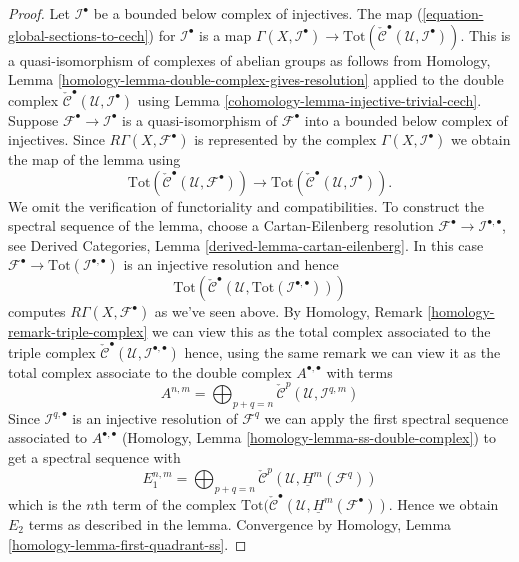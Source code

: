 \begin{proof}

Let ${\mathcal I}^\bullet$ be a bounded below complex of injectives.
The map (\ref{equation-global-sections-to-cech}) for
$\mathcal{I}^\bullet$ is a map
$\Gamma(X, {\mathcal I}^\bullet) \to
\text{Tot}(\check{\mathcal{C}}^\bullet({\mathcal U}, {\mathcal I}^\bullet))$.
This is a quasi-isomorphism of complexes of abelian groups
as follows from
Homology, Lemma \ref{homology-lemma-double-complex-gives-resolution}
applied to the double complex
$\check{\mathcal{C}}^\bullet({\mathcal U}, {\mathcal I}^\bullet)$ using
Lemma \ref{cohomology-lemma-injective-trivial-cech}.
Suppose ${\mathcal F}^\bullet \to {\mathcal I}^\bullet$ is a quasi-isomorphism
of ${\mathcal F}^\bullet$ into a bounded below complex of injectives.
Since $R\Gamma(X, {\mathcal F}^\bullet)$ is represented by the complex
$\Gamma(X, {\mathcal I}^\bullet)$ we obtain the map of the lemma
using
$$
\text{Tot}(\check{\mathcal{C}}^\bullet({\mathcal U}, {\mathcal F}^\bullet))
\longrightarrow
\text{Tot}(\check{\mathcal{C}}^\bullet({\mathcal U}, {\mathcal I}^\bullet)).
$$
We omit the verification of functoriality and compatibilities.
To construct the spectral sequence of the lemma, choose a Cartan-Eilenberg
resolution $\mathcal{F}^\bullet \to \mathcal{I}^{\bullet, \bullet}$, see
Derived Categories, Lemma \ref{derived-lemma-cartan-eilenberg}. In this
case $\mathcal{F}^\bullet \to \text{Tot}(\mathcal{I}^{\bullet, \bullet})$
is an injective resolution and hence
$$
\text{Tot}(\check{\mathcal{C}}^\bullet({\mathcal U},
\text{Tot}({\mathcal I}^{\bullet, \bullet})))
$$
computes $R\Gamma(X, \mathcal{F}^\bullet)$ as we've seen above.
By Homology, Remark \ref{homology-remark-triple-complex}
we can view this as the total complex associated to the
triple complex
$\check{\mathcal{C}}^\bullet({\mathcal U}, {\mathcal I}^{\bullet, \bullet})$
hence, using the same remark we can view it as the total complex
associate to the double complex $A^{\bullet, \bullet}$ with terms
$$
A^{n, m} =
\bigoplus\nolimits_{p + q = n}
\check{\mathcal{C}}^p({\mathcal U}, \mathcal{I}^{q, m})
$$
Since $\mathcal{I}^{q, \bullet}$ is an injective resolution of
$\mathcal{F}^q$ we can apply the first spectral sequence associated to
$A^{\bullet, \bullet}$
(Homology, Lemma \ref{homology-lemma-ss-double-complex})
to get a spectral sequence with
$$
E_1^{n, m} =
\bigoplus\nolimits_{p + q = n}
\check{\mathcal{C}}^p(\mathcal{U}, \underline{H}^m(\mathcal{F}^q))
$$
which is the $n$th term of the complex
$\text{Tot}(\check{\mathcal{C}}^\bullet(\mathcal{U},
\underline{H}^m(\mathcal{F}^\bullet))$. Hence we obtain
$E_2$ terms as described in the lemma. Convergence by
Homology, Lemma \ref{homology-lemma-first-quadrant-ss}.
\end{proof}


